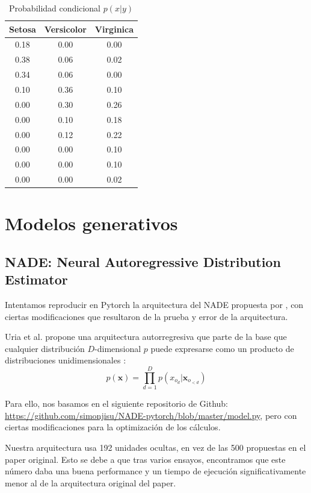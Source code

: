 \documentclass[11pt]{article}
\begin{document}
\begin{table}[h]
\centering
\begin{tabular}{c|c|c}
\textbf{Setosa}                   & \textbf{Versicolor}               &  \textbf{Virginica} \\ \hline \hline
        0.18& 0.00& 0.00\\
        0.38& 0.06& 0.02\\
        0.34& 0.06& 0.00\\
        0.10& 0.36& 0.10\\
        0.00& 0.30& 0.26\\
        0.00& 0.10& 0.18\\
        0.00& 0.12& 0.22\\
        0.00& 0.00& 0.10\\
        0.00& 0.00& 0.10\\
        0.00& 0.00& 0.02\\
    \end{tabular}
    \caption{Probabilidad condicional $p(x|y)$}
    \label{tab:cond_xy}
\end{table}

\newpage

\section{Modelos generativos}
\subsection{NADE: Neural Autoregressive Distribution Estimator}

Intentamos reproducir en Pytorch la arquitectura del NADE propuesta por \cite{nade}, con ciertas modificaciones que resultaron de la prueba y error de la arquitectura.

Uria et al. propone una arquitectura autorregresiva que parte de la base que cualquier distribución $D$-dimensional $p$ puede expresarse como un producto de distribuciones unidimensionales \cite{nade}:
$$
p(\boldsymbol{x}) = \prod_{d=1}^{D}p(x_{o_d} | \boldsymbol{x}_{o_{<d}})
$$

Para ello, nos basamos en el siguiente repositorio de Github: \url{https://github.com/simonjisu/NADE-pytorch/blob/master/model.py}, pero con ciertas modificaciones para la optimización de los cálculos.

Nuestra arquitectura usa 192 unidades ocultas, en vez de las 500 propuestas en el paper original. Esto se debe a que tras varios ensayos, encontramos que este número daba una buena performance y un tiempo de ejecución significativamente menor al de la arquitectura original del paper. 
\end{document}
